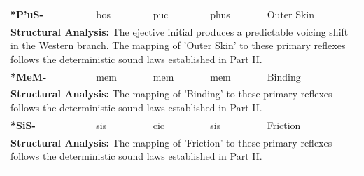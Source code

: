 \begin{longtable}{p{} p{} p{} p{} p{}}
\textbf{*P'uS-} & bos & puc & phus & Outer Skin \\ 
\multicolumn{5}{p{\textwidth}}{\small \textbf{Structural Analysis:} The ejective initial produces a predictable voicing shift in the Western branch. The mapping of 'Outer Skin' to these primary reflexes follows the deterministic sound laws established in Part II.} \\ \addlinespace[15pt] 
\textbf{*MeM-} & mem & mem & mem & Binding \\ 
\multicolumn{5}{p{\textwidth}}{\small \textbf{Structural Analysis:}  The mapping of 'Binding' to these primary reflexes follows the deterministic sound laws established in Part II.} \\ \addlinespace[15pt] 
\textbf{*SiS-} & sis & cic & sis & Friction \\ 
\multicolumn{5}{p{\textwidth}}{\small \textbf{Structural Analysis:}  The mapping of 'Friction' to these primary reflexes follows the deterministic sound laws established in Part II.} \\ \addlinespace[15pt] 
\end{longtable}
